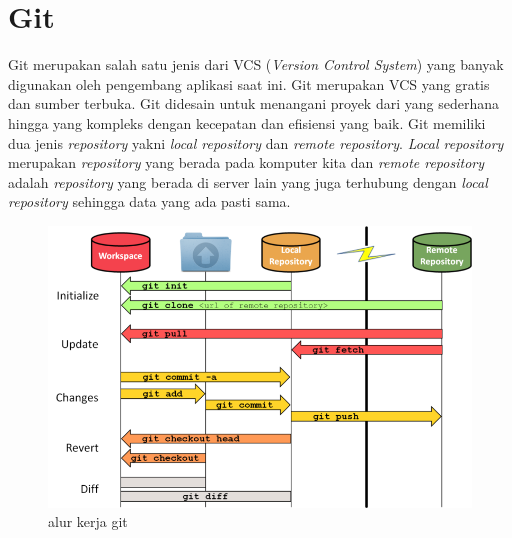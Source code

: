        	\section{Git}
       		Git merupakan salah satu jenis dari VCS (\textit{Version Control System}) yang banyak digunakan oleh pengembang aplikasi saat ini. Git merupakan VCS yang gratis dan sumber terbuka. Git didesain untuk menangani proyek dari yang sederhana hingga yang kompleks dengan kecepatan dan efisiensi yang baik\cite{git_about}. Git memiliki dua jenis \textit{repository} yakni \textit{local repository} dan \textit{remote repository}. \textit{Local repository} merupakan \textit{repository} yang berada pada komputer kita dan \textit{remote repository} adalah \textit{repository} yang berada di server lain yang juga terhubung dengan \textit{local repository} sehingga data yang ada pasti sama.
       		
       			\begin{figure}[H]
       			\centering
       			\includegraphics[width=\textwidth]{Images/C-2/Git_workflow.png}
       			\caption{alur kerja git \cite{git_workflow} }
       			\label{GitWorkflow}
       			\end{figure}
       		
        	
        

